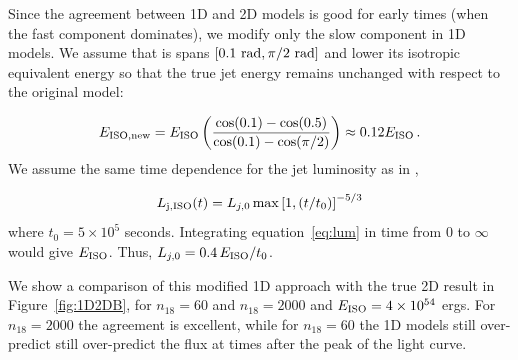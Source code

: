 \documentclass[usenatbib,fleqn]{mnras}
\begin{document}
Since the agreement between 1D and 2D models is good for early times
(when the fast component dominates), we modify only the slow component
in 1D models. We assume that is spans $[0.1\ {\rm rad}, \pi/2\ {\rm
  rad}]$ and lower its isotropic equivalent energy so that the true
jet energy remains unchanged with respect to the original model:

\begin{equation}\label{eq:Eiso}
 E_{\rm ISO, new} = E_{\rm ISO} \left(\frac{\cos(0.1) - \cos(0.5)}{\cos(0.1) - \cos(\pi/2)}\right)\approx 0.12 E_{\rm ISO}\, .
\end{equation}
%
We assume the same time dependence for the jet luminosity as in
\citet{Mimica+2015},

\begin{equation}\label{eq:lum}
L_{\rm j, ISO}(t) = L_{j,0}\max\left[1, (t/t_0)\right]^{-5/3}
\end{equation}
%
where $t_0 = 5\times 10^5$ seconds. Integrating equation~\ref{eq:lum}
in time from $0$ to $\infty$ would give $E_{\rm ISO}$. Thus,
$L_{j,0}=0.4\, E_{\rm ISO}/t_0$. 

We show a comparison of this modified 1D approach with the true 2D
result in Figure~\ref{fig:1D2DB}, for $n_{18}=60$ and $n_{18}=2000$
and $E_{\rm ISO}=4 \times 10^{54}$ ergs. For $n_{18}=2000$ the
agreement is excellent, while for $n_{18}=60$ the 1D models still
over-predict still over-predict the flux at times after the peak of
the light curve.

\end{document}
